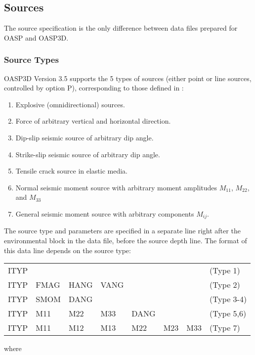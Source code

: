 \subsection{Sources}

The source specification is the only difference between data files
prepared for OASP and OASP3D.

\subsubsection{Source Types}

    OASP3D  Version 3.5 supports the 5 types of sources (either  point 
or line sources, controlled by option P), corresponding to those
defined in \cite{jkim}:
\begin{enumerate}
    \item    Explosive (omnidirectional) sources.
    \item    Force of arbitrary vertical and horizontal direction.
    \item    Dip-slip  seismic  source of arbitrary  dip angle.
    \item    Strike-slip seismic source of arbitrary dip angle.
    \item    Tensile crack source in elastic media.
    \item    Normal seismic moment source with arbitrary moment
amplitudes $M_{11}$, $M_{22}$, and $M_{33}$
    \item    General seismic moment source with arbitrary components $M_{ij}$.
\end{enumerate}


    The  source type and parameters are specified in a separate  line 
right  after the environmental block in the data file,  
before the source depth line. The format of this data line depends on
the source type:

\begin{tabular}{llllllll}
    ITYP     & & & &                      & & &         (Type 1) \\
    ITYP &  FMAG  &    HANG  &  VANG  & & &   &   (Type 2) \\
    ITYP &  SMOM  &    DANG  &          &  & & &    (Type 3-4) \\
    ITYP &  M11  & M22 & M33 & DANG & & & (Type 5,6) \\
    ITYP &  M11 & M12 & M13 & M22 & M23 & M33 & (Type 7) 
\end{tabular}

\noindent where

